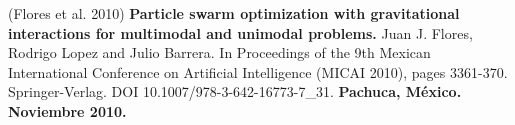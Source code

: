 \begin{innerlist}
\item (Flores et al. 2010) \textbf{Particle swarm optimization with gravitational interactions for multimodal and unimodal problems.} Juan J. Flores, Rodrigo Lopez and Julio Barrera.  In {Proceedings of the 9th Mexican International Conference on Artificial Intelligence (MICAI 2010)}, pages 3361-370. Springer-Verlag. DOI 10.1007/978-3-642-16773-7\_31. \textbf{Pachuca, México. Noviembre 2010.}

\end{innerlist}
